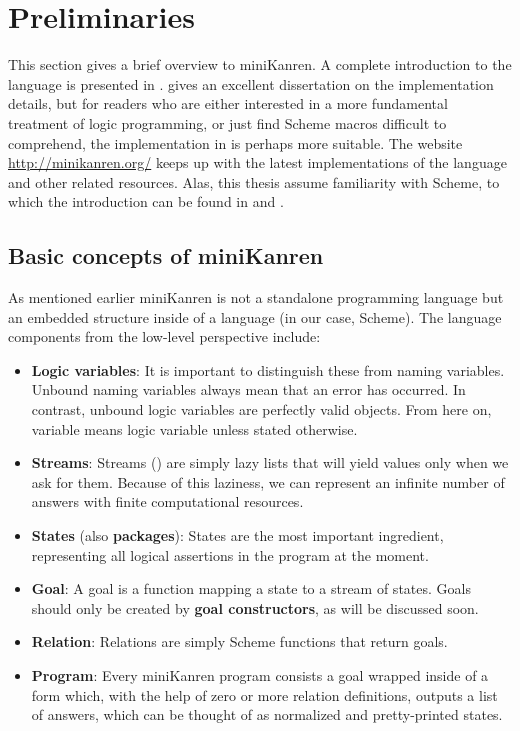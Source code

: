 \section{Preliminaries}
\label{prelim}
This section gives a brief overview to miniKanren.
A complete introduction to the language is presented in \textcite{reasoned}.
\textcite{byrdphd} gives an excellent dissertation on the implementation details, but for readers who are either interested in a more fundamental treatment of logic programming, or just find Scheme macros difficult to comprehend, the implementation in \textcite{micro} is perhaps more suitable.
The website \url{http://minikanren.org/} keeps up with the latest implementations of the language and other related resources. Alas, this thesis assume familiarity with Scheme, to which the introduction can be found in \textcite{sicp} and \textcite{tspl4}.

\subsection{Basic concepts of miniKanren}
As mentioned earlier miniKanren is not a standalone programming language but an embedded structure inside of a language (in our case, Scheme). The language components from the low-level perspective include:
\begin{itemize}
\item \textbf{Logic variables}: It is important to distinguish these from naming variables. Unbound naming variables always mean that an error has occurred. In contrast, unbound logic variables are perfectly valid objects. From here on, variable means logic variable unless stated otherwise.
\item \textbf{Streams}: Streams (\cite{sicp}) are simply lazy lists that will yield values only when we ask for them. Because of this laziness, we can represent an infinite number of answers with finite computational resources.
\item \textbf{States} (also \textbf{packages}): States are the most important ingredient, representing all logical assertions in the program at the moment.
\item \textbf{Goal}: A goal is a function mapping a state to a stream of states. Goals should only be created by \textbf{goal constructors}, as will be discussed soon.
\item \textbf{Relation}: Relations are simply Scheme functions that return goals.
\item \textbf{Program}: Every miniKanren program consists a goal wrapped inside of a  form which, with the help of zero or more relation definitions, outputs a list of answers, which can be thought of as normalized and pretty-printed states.
\end{itemize}


